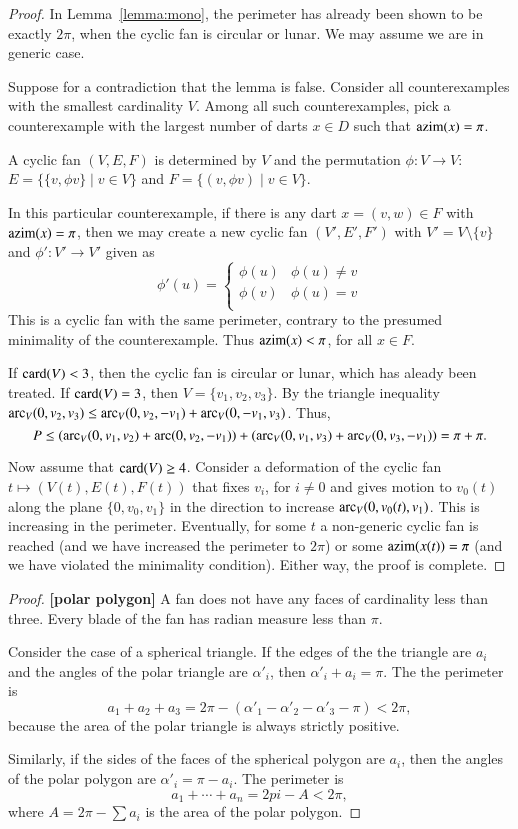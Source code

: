 \begin{proof} In Lemma~\ref{lemma:mono}, the perimeter has already been shown to be exactly $2\pi$, when the cyclic fan is circular or lunar.  We may assume we are in generic case.

Suppose for a contradiction that the lemma is false.  Consider all counterexamples with the smallest cardinality $V$.  Among all such counterexamples, pick a counterexample with the largest number of darts $x\in D$ such that ${\operatorname{azim}}(x) = \pi$.

A cyclic fan $(V,E,F)$ is determined by $V$ and the permutation $\phi:V\to V$:  $E=\{\{v,\phi v\}\mid v\in V\}$ and $F = \{(v,\phi v)\mid v\in V\}$.

In this particular counterexample, if there is any dart $x=(v,w)\in F$ with ${\operatorname{azim}}(x)=\pi$, then we may create a new cyclic fan $(V',E',F')$ with $V' = V\setminus\{v\}$ and $\phi':V'\to V'$ given as 
$$
\phi'(u) = \begin{cases}
\phi(u) & \phi(u)\ne v\\
\phi(v) & \phi(u) = v\\
\end{cases}
$$
This is a cyclic fan with the same perimeter, contrary to the presumed minimality of the counterexample.  Thus ${\operatorname{azim}}(x) <\pi$, for all $x\in F$.

If ${\operatorname{card}}(V) <3$, then the cyclic fan is circular or lunar, which has aleady been treated.  If ${\operatorname{card}}(V)=3$, then $V=\{v_1,v_2,v_3\}$.  By the triangle inequality $\operatorname{arc}_V(0,v_2,v_3) \le \operatorname{arc}_V(0,v_2,-v_1)+\operatorname{arc}_V(0,-v_1,v_3)$.  Thus,
$$
P \le(\operatorname{arc}_V(0,v_1,v_2)+\operatorname{arc}(0,v_2,-v_1))+(\operatorname{arc}_V(0,v_1,v_3)+\operatorname{arc}_V(0,v_3,-v_1)) = \pi+\pi.
$$

Now assume that ${\operatorname{card}}(V)\ge 4$.  Consider a deformation of the cyclic fan $t\mapsto (V(t),E(t),F(t))$ that fixes $v_i$, for $i\ne 0$ and gives motion to $v_0(t)$ along the plane $\{0,v_0,v_1\}$ in the direction to increase $\operatorname{arc}_V(0,v_0(t),v_1)$.  This is increasing in the perimeter.  Eventually, for some $t$ a non-generic cyclic fan is reached (and we have increased the perimeter to $2\pi$) or some ${\operatorname{azim}}(x(t))=\pi$ (and we have violated the minimality condition).  Either way, the proof is complete. 
\end{proof}

\begin{proof} {\bf [polar polygon]} A fan does not have any faces of cardinality less than three.
Every blade of the fan has radian measure less than $\pi$.  

Consider the case of a spherical triangle.  If the edges of the
the triangle are $a_i$ and the angles of the polar
triangle are $\alpha'_i$, then $\alpha'_i+a_i=\pi$.
The the perimeter is 
$$a_1+a_2+a_3 = 2\pi - (\alpha'_1 -\alpha'_2 - \alpha'_3-\pi) < 2\pi,$$
because the area of the polar triangle is always strictly positive.

Similarly, if the sides of the faces of the spherical polygon are
$a_i$, then the angles of the polar polygon are $\alpha'_i = \pi-a_i$.
The perimeter is
$$
a_1+\cdots+a_n  = 2pi- A< 2\pi,
$$
where $A = 2\pi-\sum a_i$ is the area of the polar polygon.
\end{proof}



